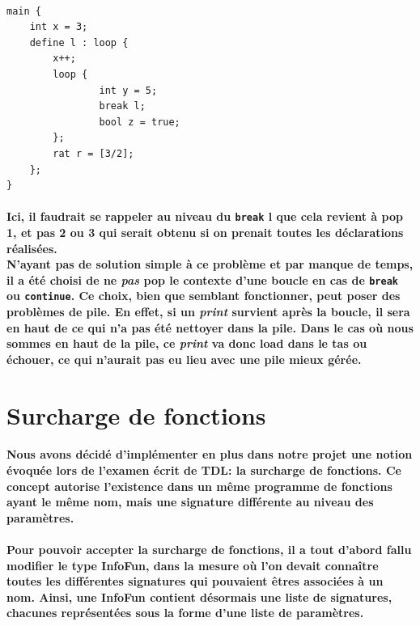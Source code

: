 \documentclass[french]{article}
\begin{document}
\, %
\begin{lstlisting}[language=ratcode]
main {
    int x = 3;
    define l : loop {
        x++;
        loop {
                int y = 5;
                break l;
                bool z = true;
        };
        rat r = [3/2];
    };
}
\end{lstlisting}
\paragraph*{Ici, il faudrait se rappeler au niveau du \texttt{break} l que cela revient à pop 1, et pas 2 ou 3 qui serait obtenu si on prenait toutes les déclarations réalisées.\\
N'ayant pas de solution simple à ce problème et par manque de temps, il a été choisi de ne \emph{pas} pop le contexte d'une boucle en cas de \texttt{break} ou \texttt{continue}.
Ce choix, bien que semblant fonctionner, peut poser des problèmes de pile. En effet, si un \emph{print} survient après la boucle, il sera en haut de ce qui n'a pas été nettoyer dans la pile.
Dans le cas où nous sommes en haut de la pile, ce \emph{print} va donc load dans le tas ou échouer, ce qui n'aurait pas eu lieu avec une pile mieux gérée.}

\section{Surcharge de fonctions}
\paragraph{Nous avons décidé d'implémenter en plus dans notre projet une notion évoquée lors de l'examen écrit de TDL: la surcharge de fonctions.
Ce concept autorise l'existence dans un même programme de fonctions ayant le même nom, mais une signature différente au niveau des paramètres.}
\paragraph{Pour pouvoir accepter la surcharge de fonctions, il a tout d'abord fallu modifier le type InfoFun, dans la mesure où l'on devait connaître 
toutes les différentes signatures qui pouvaient êtres associées à un nom. Ainsi, une InfoFun contient désormais une liste de signatures, chacunes représentées sous
la forme d'une liste de paramètres.}
\end{document}
